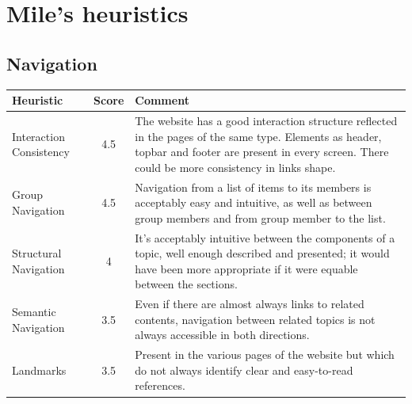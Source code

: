 
\section{Mile's heuristics}
\subsection{Navigation}
\label{Navigation}
\begin{table}[H]
  \begin{center}
    \label{tab:table1}
    \begin{tabular}{||l|c|p{8cm}||} %
      \textbf{Heuristic} & \textbf{Score} & \textbf{Comment}\\
      
      \hline
      Interaction Consistency & 4.5 & The website has a good interaction structure reflected in the pages of the same type. Elements as header, topbar and footer are present in every screen. There could be more consistency in links shape.\\
      \hline
      Group Navigation & 4.5 & Navigation from a list of items to its members is acceptably easy and intuitive, as well as between group members and from group member to the list.\\
      \hline
      Structural Navigation & 4 & It's acceptably intuitive between the components of a topic, well enough described and presented; it would have been more appropriate if it were equable between the sections.\\
      \hline
      Semantic Navigation & 3.5 & Even if there are almost always links to related contents, navigation between related topics is not always accessible in both directions.\\
      \hline
      Landmarks & 3.5 & Present in the various pages of the website but which do not always identify clear and easy-to-read references.\\

    \end{tabular}
  \end{center}
\end{table}
\medskip


